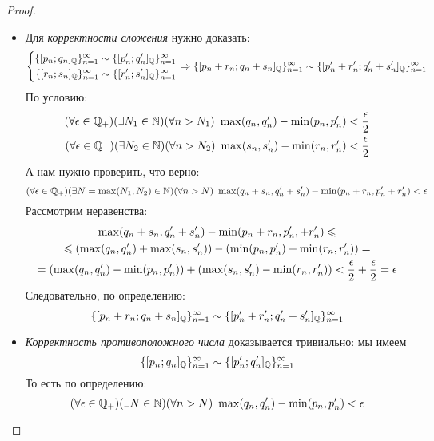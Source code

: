 \begin{proof}~

    \begin{itemize}
        \item Для \textit{корректности сложения} нужно доказать:
            \[
            \left\{\begin{aligned}\{[p_n; q_n]_{\mathbb{Q}}\}_{n = 1}^\infty \sim
                \{[p'_n; q'_n]_{\mathbb{Q}}\}_{n = 1}^\infty \\ 
                    \{[r_n; s_n]_{\mathbb{Q}}\}_{n = 1}^\infty \sim
                \{[r'_n; s'_n]_{\mathbb{Q}}\}_{n = 1}^\infty\end{aligned}\right.
            \Rightarrow
            \{[p_n + r_n; q_n + s_n]_{\mathbb{Q}}\}_{n = 1}^\infty \sim
            \{[p'_n + r'_n; q'_n + s'_n]_{\mathbb{Q}}\}_{n = 1}^\infty
            \]
            По условию:
            \begin{align*}
                (\forall \epsilon \in \mathbb{Q}_+)(\exists N_1 \in \mathbb{N})
                (\forall n > N_1)\ \max(q_n, q'_n) - \min(p_n, p'_n)
                < \frac{\epsilon}{2} \\
                (\forall \epsilon \in \mathbb{Q}_+)(\exists N_2 \in \mathbb{N})
                (\forall n > N_2)\ \max(s_n, s'_n) - \min(r_n, r'_n)
                < \frac{\epsilon}{2}
            \end{align*}
            А нам нужно проверить, что верно:
            \[
                (\forall \epsilon \in \mathbb{Q}_+)(\exists N = \max(N_1, N_2) \in \mathbb{N})
                (\forall n > N)\ \max(q_n + s_n, q'_n + s'_n) -
                \min(p_n + r_n, p'_n + r'_n) < \epsilon
            \]
            Рассмотрим неравенства:
            \begin{multline*}
                \max(q_n + s_n, q'_n + s'_n) -
                \min(p_n + r_n, p'_n, + r'_n) \leqslant \\
                \leqslant (\max(q_n, q'_n) + \max(s_n, s'_n)) -
                (\min(p_n, p'_n) + \min(r_n, r'_n)) = \\
                = (\max(q_n, q'_n) - \min(p_n, p'_n)) +
                (\max(s_n, s'_n) - \min(r_n, r'_n)) <
                \frac{\epsilon}{2} + \frac{\epsilon}{2} = \epsilon
            \end{multline*}
            Следовательно, по определению:
            \[
                \{[p_n + r_n; q_n + s_n]_{\mathbb{Q}}\}_{n = 1}^\infty \sim \{[p'_n + r'_n; q'_n + s'_n]_{\mathbb{Q}}\}_{n = 1}^\infty
            \]
        \item \textit{Корректность противоположного числа} доказывается
            тривиально: мы имеем
            \[
                \{[p_n; q_n]_{\mathbb{Q}}\}_{n = 1}^\infty \sim
                \{[p'_n; q'_n]_{\mathbb{Q}}\}_{n = 1}^\infty
            \]
            То есть по определению:
            \[
                (\forall \epsilon \in \mathbb{Q}_+)(\exists N \in \mathbb{N})
                (\forall n > N)\ \max(q_n, q'_n) - \min(p_n, p'_n)
                < \epsilon
            \]


\end{itemize}
\end{proof}
